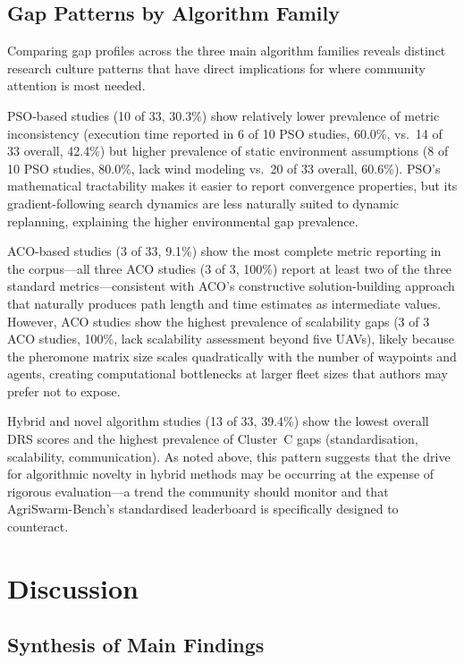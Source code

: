 \documentclass[review,3p,times]{elsarticle}
\begin{document}
\subsection{Gap Patterns by Algorithm Family}

Comparing gap profiles across the three main algorithm families reveals distinct research culture patterns that have direct implications for where community attention is most needed.

PSO-based studies (10 of 33, 30.3\%) show relatively lower prevalence of metric inconsistency (execution time reported in 6 of 10 PSO studies, 60.0\%, vs.\ 14 of 33 overall, 42.4\%) but higher prevalence of static environment assumptions (8 of 10 PSO studies, 80.0\%, lack wind modeling vs.\ 20 of 33 overall, 60.6\%). PSO's mathematical tractability makes it easier to report convergence properties, but its gradient-following search dynamics are less naturally suited to dynamic replanning, explaining the higher environmental gap prevalence.

ACO-based studies (3 of 33, 9.1\%) show the most complete metric reporting in the corpus---all three ACO studies (3 of 3, 100\%) report at least two of the three standard metrics---consistent with ACO's constructive solution-building approach that naturally produces path length and time estimates as intermediate values. However, ACO studies show the highest prevalence of scalability gaps (3 of 3 ACO studies, 100\%, lack scalability assessment beyond five UAVs), likely because the pheromone matrix size scales quadratically with the number of waypoints and agents, creating computational bottlenecks at larger fleet sizes that authors may prefer not to expose.

Hybrid and novel algorithm studies (13 of 33, 39.4\%) show the lowest overall DRS scores and the highest prevalence of Cluster~C gaps (standardisation, scalability, communication). As noted above, this pattern suggests that the drive for algorithmic novelty in hybrid methods may be occurring at the expense of rigorous evaluation---a trend the community should monitor and that AgriSwarm-Bench's standardised leaderboard is specifically designed to counteract.


\section{Discussion}

\subsection{Synthesis of Main Findings}
\end{document}
